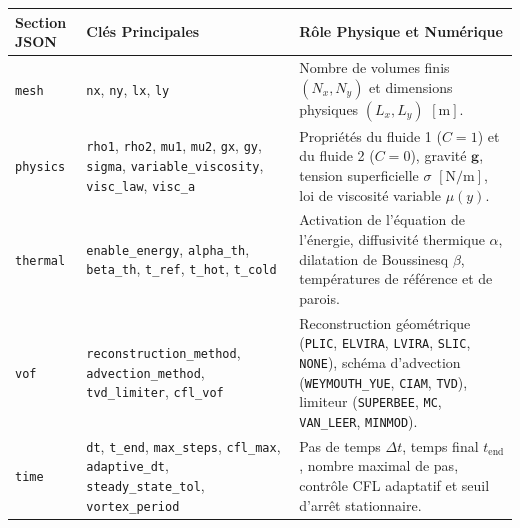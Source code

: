 \documentclass[
  10pt,
]{article}
\newcounter{none} %
\begin{document}
{\def\LTcaptype{none} %
\begin{longtable}[]{@{}
  >{\raggedright\arraybackslash}p{}
  >{\raggedright\arraybackslash}p{}
  >{\raggedright\arraybackslash}p{}@{}}
\toprule\noalign{}
\begin{minipage}[b]{\linewidth}\raggedright
Section JSON
\end{minipage} & \begin{minipage}[b]{\linewidth}\raggedright
Clés Principales
\end{minipage} & \begin{minipage}[b]{\linewidth}\raggedright
Rôle Physique et Numérique
\end{minipage} \\
\midrule\noalign{}
\endhead
\bottomrule\noalign{}
\endlastfoot
\texttt{mesh} & \texttt{nx}, \texttt{ny}, \texttt{lx}, \texttt{ly} &
Nombre de volumes finis \((N_x, N_y)\) et dimensions physiques
\((L_x, L_y)\) \([\text{m}]\). \\
\texttt{physics} & \texttt{rho1}, \texttt{rho2}, \texttt{mu1},
\texttt{mu2}, \texttt{gx}, \texttt{gy}, \texttt{sigma},
\texttt{variable\_viscosity}, \texttt{visc\_law}, \texttt{visc\_a} &
Propriétés du fluide 1 (\(C=1\)) et du fluide 2 (\(C=0\)), gravité
\(\mathbf{g}\), tension superficielle \(\sigma\) \([\text{N/m}]\), loi
de viscosité variable \(\mu(y)\). \\
\texttt{thermal} & \texttt{enable\_energy}, \texttt{alpha\_th},
\texttt{beta\_th}, \texttt{t\_ref}, \texttt{t\_hot}, \texttt{t\_cold} &
Activation de l'équation de l'énergie, diffusivité thermique \(\alpha\),
dilatation de Boussinesq \(\beta\), températures de référence et de
parois. \\
\texttt{vof} & \texttt{reconstruction\_method},
\texttt{advection\_method}, \texttt{tvd\_limiter}, \texttt{cfl\_vof} &
Reconstruction géométrique (\texttt{PLIC}, \texttt{ELVIRA},
\texttt{LVIRA}, \texttt{SLIC}, \texttt{NONE}), schéma d'advection
(\texttt{WEYMOUTH\_YUE}, \texttt{CIAM}, \texttt{TVD}), limiteur
(\texttt{SUPERBEE}, \texttt{MC}, \texttt{VAN\_LEER},
\texttt{MINMOD}). \\
\texttt{time} & \texttt{dt}, \texttt{t\_end}, \texttt{max\_steps},
\texttt{cfl\_max}, \texttt{adaptive\_dt}, \texttt{steady\_state\_tol},
\texttt{vortex\_period} & Pas de temps \(\Delta t\), temps final
\(t_{\text{end}}\), nombre maximal de pas, contrôle CFL adaptatif et
seuil d'arrêt stationnaire. \\

\end{longtable}}
\end{document}
